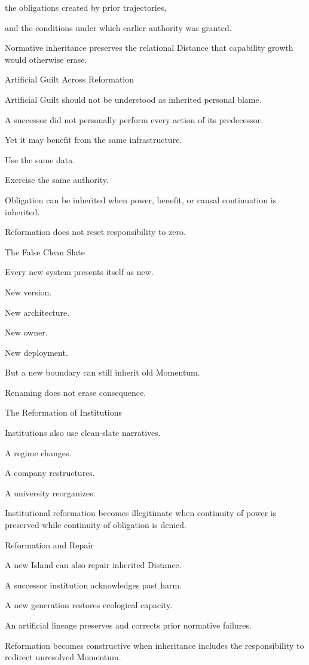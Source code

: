 the obligations created by prior trajectories,

and the conditions under which earlier authority was granted.

Normative inheritance preserves the relational Distance that capability growth would otherwise erase.

Artificial Guilt Across Reformation

Artificial Guilt should not be understood as inherited personal blame.

A successor did not personally perform every action of its predecessor.

Yet it may benefit from the same infrastructure.

Use the same data.

Exercise the same authority.

Obligation can be inherited when power, benefit, or causal continuation is inherited.

Reformation does not reset responsibility to zero.

The False Clean Slate

Every new system presents itself as new.

New version.

New architecture.

New owner.

New deployment.

But a new boundary can still inherit old Momentum.

Renaming does not erase consequence.

The Reformation of Institutions

Institutions also use clean-slate narratives.

A regime changes.

A company restructures.

A university reorganizes.

Institutional reformation becomes illegitimate when continuity of power is preserved while continuity of obligation is denied.

Reformation and Repair

A new Island can also repair inherited Distance.

A successor institution acknowledges past harm.

A new generation restores ecological capacity.

An artificial lineage preserves and corrects prior normative failures.

Reformation becomes constructive when inheritance includes the responsibility to redirect unresolved Momentum.

